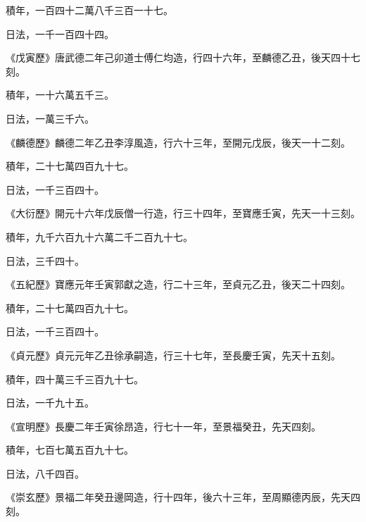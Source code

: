 \begin{pinyinscope}
 積年，一百四十二萬八千三百一十七。



 日法，一千一百四十四。



 《戊寅歷》唐武德二年己卯道士傅仁均造，行四十六年，至麟德乙丑，後天四十七刻。



 積年，一十六萬五千三。



 日法，一萬三千六。



 《麟德歷》麟德二年乙丑李淳風造，行六十三年，至開元戊辰，後天一十二刻。



 積年，二十七萬四百九十七。



 日法，一千三百四十。



 《大衍歷》開元十六年戊辰僧一行造，行三十四年，至寶應壬寅，先天一十三刻。



 積年，九千六百九十六萬二千二百九十七。



 日法，三千四十。



 《五紀歷》寶應元年壬寅郭獻之造，行二十三年，至貞元乙丑，後天二十四刻。



 積年，二十七萬四百九十七。



 日法，一千三百四十。



 《貞元歷》貞元元年乙丑徐承嗣造，行三十七年，至長慶壬寅，先天十五刻。



 積年，四十萬三千三百九十七。



 日法，一千九十五。



 《宣明歷》長慶二年壬寅徐昂造，行七十一年，至景福癸丑，先天四刻。



 積年，七百七萬五百九十七。



 日法，八千四百。



 《崇玄歷》景福二年癸丑邊岡造，行十四年，後六十三年，至周顯德丙辰，先天四刻。




\end{pinyinscope}
